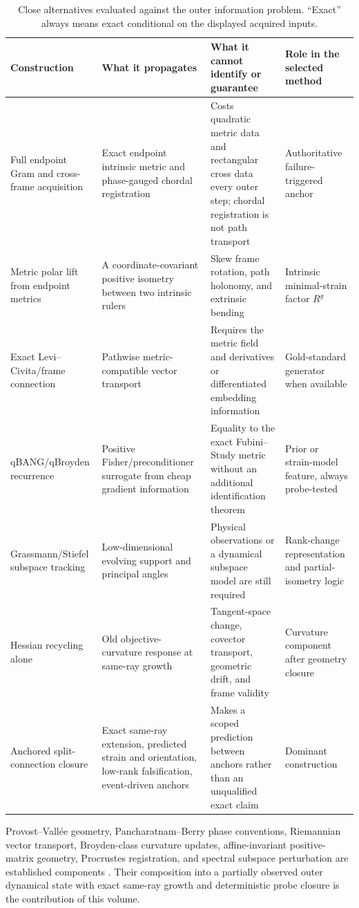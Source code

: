 \documentclass[10pt,twocolumn]{article}
\theoremstyle{definition}
\theoremstyle{remark}
\begin{document}
\begin{table}[t]
\centering
\caption{Close alternatives evaluated against the outer information problem.  “Exact” always means exact conditional on the displayed acquired inputs.}
\label{tab:alternatives}
\small
\begin{tabularx}{\textwidth}{@{}p{31mm}X X X@{}}
\toprule
Construction & What it propagates & What it cannot identify or guarantee & Role in the selected method\\
\midrule
Full endpoint Gram and cross-frame acquisition & Exact endpoint intrinsic metric and phase-gauged chordal registration & Costs quadratic metric data and rectangular cross data every outer step; chordal registration is not path transport & Authoritative failure-triggered anchor\\
Metric polar lift from endpoint metrics & A coordinate-covariant positive isometry between two intrinsic rulers & Skew frame rotation, path holonomy, and extrinsic bending & Intrinsic minimal-strain factor $R^g$\\
Exact Levi--Civita/frame connection & Pathwise metric-compatible vector transport & Requires the metric field and derivatives or differentiated embedding information & Gold-standard generator when available\\
qBANG/qBroyden recurrence & Positive Fisher/preconditioner surrogate from cheap gradient information & Equality to the exact Fubini--Study metric without an additional identification theorem & Prior or strain-model feature, always probe-tested\\
Grassmann/Stiefel subspace tracking & Low-dimensional evolving support and principal angles & Physical observations or a dynamical subspace model are still required & Rank-change representation and partial-isometry logic\\
Hessian recycling alone & Old objective-curvature response at same-ray growth & Tangent-space change, covector transport, geometric drift, and frame validity & Curvature component after geometry closure\\
Anchored split-connection closure & Exact same-ray extension, predicted strain and orientation, low-rank falsification, event-driven anchors & Makes a scoped prediction between anchors rather than an unqualified exact claim & Dominant construction\\
\bottomrule
\end{tabularx}
\end{table}

\begin{litbox}
Provost--Vall\'ee geometry, Pancharatnam--Berry phase conventions, Riemannian vector transport, Broyden-class curvature updates, affine-invariant positive-matrix geometry, Procrustes registration, and spectral subspace perturbation are established components \cite{Provost1980,Pancharatnam1956,Berry1984,Huang2015,Moakher2005,Schonemann1966,DavisKahan1970}.  Their composition into a partially observed outer dynamical state with exact same-ray growth and deterministic probe closure is the contribution of this volume.
\end{litbox}
\end{document}
